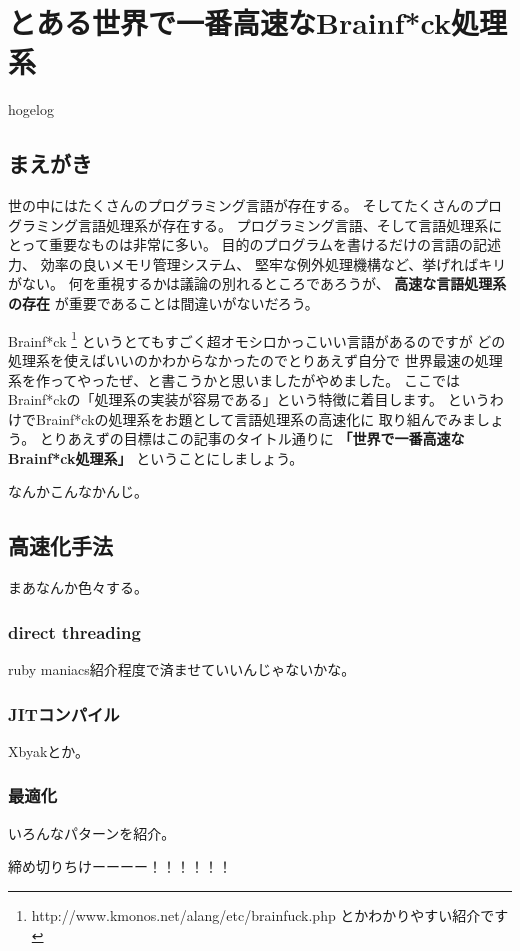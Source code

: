 
\cleardoublepage
\plainifnotempty

\chapter{とある世界で一番高速なBrainf*ck処理系}
\begin{flushright}
hogelog
\end{flushright}

\section{まえがき}
\lettrine{世}
の中にはたくさんのプログラミング言語が存在する。
そしてたくさんのプログラミング言語処理系が存在する。
プログラミング言語、そして言語処理系にとって重要なものは非常に多い。
目的のプログラムを書けるだけの言語の記述力、
効率の良いメモリ管理システム、
堅牢な例外処理機構など、挙げればキリがない。
何を重視するかは議論の別れるところであろうが、
{\LARGE \textbf{高速な言語処理系の存在}}
が重要であることは間違いがないだろう。

Brainf*ck
\footnote{http://www.kmonos.net/alang/etc/brainfuck.php とかわかりやすい紹介です}
というとてもすごく超オモシロかっこいい言語があるのですが
どの処理系を使えばいいのかわからなかったのでとりあえず自分で
世界最速の処理系を作ってやったぜ、と書こうかと思いましたがやめました。
ここではBrainf*ckの「処理系の実装が容易である」という特徴に着目します。
というわけでBrainf*ckの処理系をお題として言語処理系の高速化に
取り組んでみましょう。
とりあえずの目標はこの記事のタイトル通りに
{\LARGE \textbf{「世界で一番高速なBrainf*ck処理系」}}
ということにしましょう。

なんかこんなかんじ。

\section{高速化手法}
まあなんか色々する。

\subsection{direct threading}
ruby maniacs紹介程度で済ませていいんじゃないかな。

\subsection{JITコンパイル}
Xbyakとか。

\subsection{最適化}
いろんなパターンを紹介。

締め切りちけーーーー！！！！！！